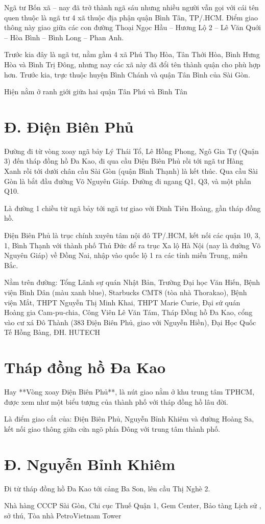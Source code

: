 Ngã tư Bốn xã – nay đã trở thành ngã sáu nhưng nhiều người vẫn gọi với cái tên quen thuộc là ngã tư 4 xã thuộc địa phận quận Bình Tân, TP/.HCM. Điểm giao thông này giao giữa các con đường Thoại Ngọc Hầu – Hương Lộ 2 – Lê Văn Quới – Hòa Bình – Bình Long – Phan Anh.

Trước kia đây là ngã tư, nằm gầm 4 xã Phú Thọ Hòa, Tân Thới Hòa, Bình Hưng Hòa và Bình Trị Đông, nhưng nay các xã này đã đổi tên thành quận cho phù hợp hơn. Trước kia, trực thuộc huyện Bình Chánh và quận Tân Bình của Sài Gòn.

Hiện nằm ở ranh giới giữa hai quận Tân Phú và Bình Tân

\section{Đ. Điện Biên Phủ}

Đường đi từ vòng xoay ngã bảy Lý Thái Tổ, Lê Hồng Phong, Ngô Gia Tự (Quận 3) đến tháp đồng hồ Đa Kao, đi qua cầu Điện Biên Phủ rồi tới ngã tư Hàng Xanh rồi tới dưới chân cầu Sài Gòn (quận Bình Thạnh) là kết thúc. Qua cầu Sài Gòn là bắt đầu đường Võ Nguyên Giáp. Đường đi ngang Q1, Q3, và một phần Q10.

Là đường 1 chiều từ ngã bảy tới ngã tư giao với Đinh Tiên Hoàng, gần tháp đồng hồ.

Điện Biên Phủ là trục chính xuyên tâm nội đô TP/.HCM, kết nối các quận 10, 3, 1, Bình Thạnh với thành phố Thủ Đức để ra trục Xa lộ Hà Nội (nay là đường Võ Nguyên Giáp) về Đồng Nai, nhập vào quốc lộ 1 ra các tỉnh miền Trung, miền Bắc.

Nằm trên đường: Tổng Lãnh sự quán Nhật Bản, Trường Đại học Văn Hiến, Bệnh viện Bình Dân (màu xanh blue), Starbucks CMT8 (tòa nhà Thorakao), Bệnh viện Mắt, THPT Nguyễn Thị Minh Khai, THPT Marie Curie, Đại sứ quán Hoàng gia Cam-pu-chia, Công Viên Lê Văn Tám, Tháp Đồng hồ Đa Kao, cổng vào cư xá Đô Thành (383 Điện Biên Phủ, giao với Nguyễn Hiền), Đại Học Quốc Tế Hồng Bàng, ĐH. HUTECH

\section{Tháp đồng hồ Đa Kao}

Hay **Vòng xoay Điện Biên Phủ**, là nút giao nằm ở khu trung tâm TPHCM, được xem như một biểu tượng của thành phố với tháp đồng hồ lâu đời.

Là điểm giao cắt của: Điện Biên Phủ, Nguyễn Bỉnh Khiêm và đường Hoàng Sa, kết nối giao thông giữa cửa ngõ phía Đông với trung tâm thành phố.

\section{Đ. Nguyễn Bỉnh Khiêm}

Đi từ tháp đồng hồ Đa Kao tới cảng Ba Son, lên cầu Thị Nghè 2.

Nhà hàng CCCP Sài Gòn, Chi cục Thuế Quận 1, Gem Center, Bảo tàng Lịch sử , sở thú, Tòa nhà PetroVietnam Tower

